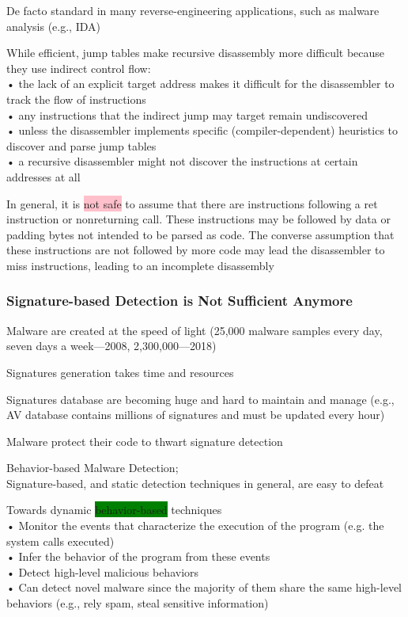 \documentclass[]{project_plan}
\begin{document}
De facto standard in many reverse-engineering applications, such as malware analysis (e.g.,
IDA)

While efficient, jump tables make recursive disassembly more difficult because
they use indirect control flow:\\
• the lack of an explicit target address makes it difficult for the disassembler to track
the flow of instructions\\
• any instructions that the indirect jump may target remain undiscovered\\
• unless the disassembler implements specific (compiler-dependent) heuristics to
discover and parse jump tables\\
• a recursive disassembler might not discover the instructions at certain addresses at all

In general, it is \colorbox{pink}{not safe} to assume that there are instructions following a ret instruction
or nonreturning call. These instructions may be followed by data or padding bytes not intended to be parsed
as code.
The converse assumption that these instructions are not followed by more code may lead
the disassembler to miss instructions, leading to an incomplete disassembly

\subsubsection{Signature-based Detection is Not Sufficient Anymore}

Malware are created at the speed of light (25,000 malware samples every day, seven
days a week—2008, 2,300,000—2018)

Signatures generation takes time and resources

Signatures database are becoming huge and hard to maintain and manage (e.g., AV
database contains millions of signatures and must be updated every hour)

Malware protect their code to thwart signature detection

Behavior-based Malware Detection;\\
Signature-based, and static detection techniques in general, are easy to defeat

Towards dynamic \colorbox{green}{behavior-based} techniques\\
• Monitor the events that characterize the execution of the program (e.g. the
system calls executed)\\
• Infer the behavior of the program from these events\\
• Detect high-level malicious behaviors\\
• Can detect novel malware since the majority of them share the same
high-level behaviors (e.g., rely spam, steal sensitive information)
\end{document}
